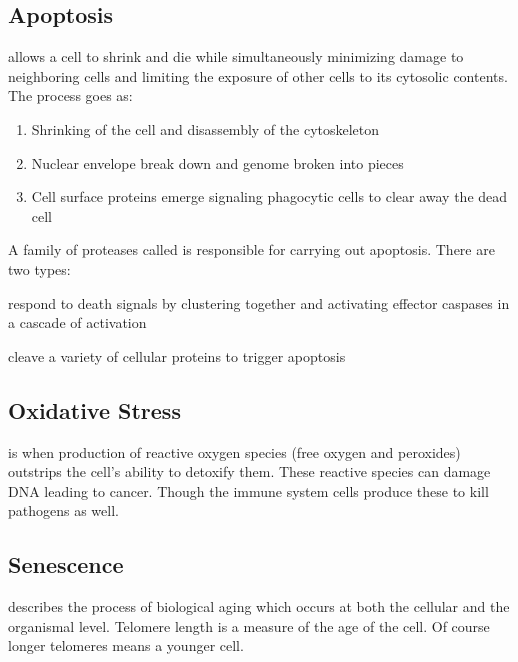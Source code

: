 \documentclass[../Bio_chemistryReview.tex]{subfiles}
\begin{document}
\subsection{Apoptosis}
 allows a cell to shrink and die while simultaneously
minimizing damage to neighboring cells and limiting the exposure of other cells
to its cytosolic contents. The process goes as:
\begin{enumerate}
    \item Shrinking of the cell and disassembly of the cytoskeleton
    \item Nuclear envelope break down and genome broken into pieces
    \item Cell surface proteins emerge signaling phagocytic cells to clear away
        the dead cell
\end{enumerate}
A family of proteases called  is responsible for carrying out
apoptosis. There are two types:
\begin{description}
    \item {} respond to death signals by clustering
        together and activating effector caspases in a cascade of activation
    \item {} cleave a variety of cellular proteins to
        trigger apoptosis
\end{description}

\subsection{Oxidative Stress}
 is when production of reactive oxygen species (free
oxygen and peroxides) outstrips the cell's ability to detoxify them. These
reactive species can damage DNA leading to cancer. Though the immune system
cells produce these to kill pathogens as well.

\subsection{Senescence}
 describes the process of biological aging which occurs at
both the cellular and the organismal level. Telomere length is a measure of the
age of the cell. Of course longer telomeres means a younger cell.
\end{document}
